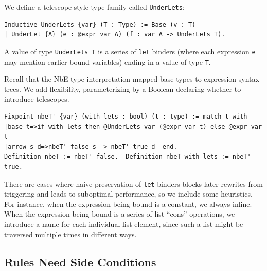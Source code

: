 \documentclass[sn-mathphys,pdflatex]{sn-jnl}%
\theoremstyle{thmstyleone}%
\theoremstyle{thmstyletwo}%
\theoremstyle{thmstylethree}%
\begin{document}
We define a telescope-style type family called \texttt{UnderLets}:
\begin{verbatim}
Inductive UnderLets {var} (T : Type) := Base (v : T)
| UnderLet {A} (e : @expr var A) (f : var A -> UnderLets T).
\end{verbatim}
A value of type \texttt{UnderLets T} is a series of \texttt{let} binders (where each expression \texttt{e} may mention earlier-bound variables) ending in a value of type \texttt{T}.

Recall that the NbE type interpretation mapped base types to expression syntax trees.
We add flexibility, parameterizing by a Boolean declaring whether to introduce telescopes.

\begin{verbatim}
Fixpoint nbeT' {var} (with_lets : bool) (t : type) := match t with
|base t=>if with_lets then @UnderLets var (@expr var t) else @expr var t
|arrow s d=>nbeT' false s -> nbeT' true d  end.
Definition nbeT := nbeT' false.  Definition nbeT_with_lets := nbeT' true.
\end{verbatim}


There are cases where naive preservation of \texttt{let} binders blocks later rewrites from triggering and leads to suboptimal performance, so we include some heuristics.
For instance, when the expression being bound is a constant, we always inline.
When the expression being bound is a series of list ``cons'' operations, we introduce a name for each individual list element, since such a list might be traversed multiple times in different ways.

\subsection{Rules Need Side Conditions}\label{sec:side-conditions}
\end{document}
